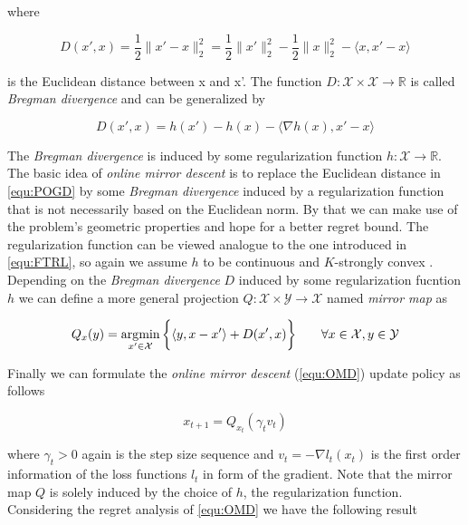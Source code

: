 where 

\begin{equation*}
    D(x',x) = \frac{1}{2}\|x'-x\|_2^2 = \frac{1}{2}\|x'\|_2^2 - \frac{1}{2}\|x\|_2^2 - \langle x,x'-x\rangle
\end{equation*}

is the Euclidean distance between x and x'. The function $D: \mathcal{X}\times\mathcal{X} \to \mathbb{R}$ is called \textit{Bregman divergence} and can be generalized by 

\begin{equation*}
    D(x',x) = h(x') - h(x) - \langle\nabla h(x), x'-x\rangle
\end{equation*}

The \textit{Bregman divergence} is induced by some regularization function $h: \mathcal{X} \to \mathbb{R}$. The basic idea of \textit{online mirror descent} is to replace the Euclidean distance in \ref{equ:POGD} by some \textit{Bregman divergence} induced by a regularization function that is not necessarily based on the Euclidean norm. By that we can make use of the problem's geometric properties and hope for a better regret bound. The regularization function can be viewed analogue to the one introduced in \ref{equ:FTRL}, so again we assume $h$ to be continuous and $K$-strongly convex \cite{HDRmertikopoulos}. \\

Depending on the \textit{Bregman divergence} $D$ induced by some regularization fucntion $h$ we can define a more general projection $Q:\mathcal{X}\times\mathcal{Y} \to \mathcal{X}$ named \textit{mirror map} as 

\begin{equation*}
    Q_x(y) = \operatorname*{\arg\!\min}_{x'\in \mathcal{X}}\bigg\{\langle y,x-x'\rangle + D(x',x)\bigg\} \qquad \forall x\in \mathcal{X}, y \in \mathcal{Y}
\end{equation*}

Finally we can formulate the \textit{online mirror descent} (\ref{equ:OMD}) update policy as follows

\begin{equation*}
    \tag{OMD}
    x_{t+1} = Q_{x_t}(\gamma_t v_t)
    \label{equ:OMD}
\end{equation*}

where $\gamma_t > 0$ again is the step size sequence and $v_t = -\nabla l_t(x_t)$ is the first order information of the loss functions $l_t$ in form of the gradient. Note that the mirror map $Q$ is solely induced by the choice of $h$, the regularization function. Considering the regret analysis of \ref{equ:OMD} we have the following result \cite[Theorem 2.4]{HDRmertikopoulos}

